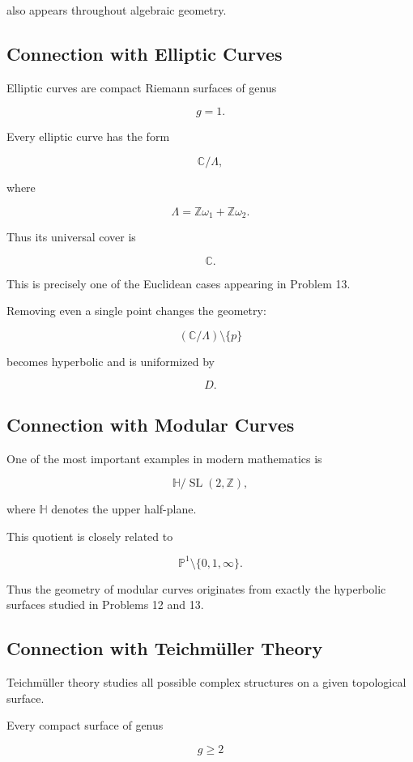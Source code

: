\documentclass[12pt,a4paper]{article}
\theoremstyle{notespace}
\begin{document}
also appears throughout algebraic geometry.

\subsection{Connection with Elliptic Curves}

Elliptic curves are compact Riemann surfaces of genus

\[
g=1.
\]

Every elliptic curve has the form

\[
\mathbb C/\Lambda,
\]

where

\[
\Lambda
=
\mathbb Z\omega_1+\mathbb Z\omega_2.
\]

Thus its universal cover is

\[
\mathbb C.
\]

This is precisely one of the Euclidean cases appearing in Problem 13.

Removing even a single point changes the geometry:

\[
(\mathbb C/\Lambda)\setminus\{p\}
\]

becomes hyperbolic and is uniformized by

\[
D.
\]

\subsection{Connection with Modular Curves}

One of the most important examples in modern mathematics is

\[
\mathbb H/\operatorname{SL}(2,\mathbb Z),
\]

where \(\mathbb H\) denotes the upper half-plane.

This quotient is closely related to

\[
\mathbb P^1\setminus\{0,1,\infty\}.
\]

Thus the geometry of modular curves originates from exactly the hyperbolic surfaces studied in Problems 12 and 13.

\subsection{Connection with Teichmüller Theory}

Teichmüller theory studies all possible complex structures on a given topological surface.

Every compact surface of genus

\[
g\ge2
\]
\end{document}
